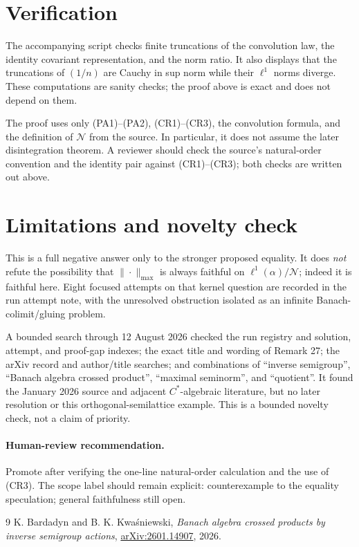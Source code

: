 \documentclass[10pt]{article}
\newcommand{\Null}{\mathcal N}
\begin{document}
\section{Verification}
The accompanying script checks finite truncations of the convolution law,
the identity covariant representation, and the norm ratio.  It also displays
that the truncations of $(1/n)$ are Cauchy in sup norm while their $\ell^1$
norms diverge.  These computations are sanity checks; the proof above is
exact and does not depend on them.

The proof uses only (PA1)--(PA2), (CR1)--(CR3), the convolution formula, and
the definition of $\Null$ from the source.  In particular, it does not assume
the later disintegration theorem.  A reviewer should check the source's
natural-order convention and the identity pair against (CR1)--(CR3); both
checks are written out above.

\section{Limitations and novelty check}
This is a full negative answer only to the stronger proposed equality.  It
does \emph{not} refute the possibility that $\|\cdot\|_{\max}$ is always
faithful on $\ell^1(\alpha)/\Null$; indeed it is faithful here.  Eight focused
attempts on that kernel question are recorded in the run attempt note, with
the unresolved obstruction isolated as an infinite Banach-colimit/gluing
problem.

A bounded search through 12 August 2026 checked the run registry and solution,
attempt, and proof-gap indexes; the exact title and wording of Remark 27; the
arXiv record and author/title searches; and combinations of ``inverse
semigroup'', ``Banach algebra crossed product'', ``maximal seminorm'', and
``quotient''.  It found the January 2026 source and adjacent $C^*$-algebraic
literature, but no later resolution or this orthogonal-semilattice example.
This is a bounded novelty check, not a claim of priority.

\paragraph{Human-review recommendation.}
Promote after verifying the one-line natural-order calculation and the use of
(CR3).  The scope label should remain explicit: counterexample to the equality
speculation; general faithfulness still open.

\begin{thebibliography}{9}
K. Bardadyn and B. K. Kwa\'sniewski,
\emph{Banach algebra crossed products by inverse semigroup actions},
\href{https://arxiv.org/abs/2601.14907}{arXiv:2601.14907}, 2026.
\end{thebibliography}
\end{document}

